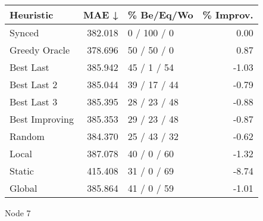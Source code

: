 \begin{tabular}{lrlr}
\toprule
\textbf{Heuristic} & \textbf{MAE ↓} & \textbf{\% Be/Eq/Wo} & \textbf{\% Improv.} \\
\midrule
            Synced &        382.018 &          0 / 100 / 0 &                0.00 \\
     Greedy Oracle &        378.696 &          50 / 50 / 0 &                0.87 \\
         Best Last &        385.942 &          45 / 1 / 54 &               -1.03 \\
       Best Last 2 &        385.044 &         39 / 17 / 44 &               -0.79 \\
       Best Last 3 &        385.395 &         28 / 23 / 48 &               -0.88 \\
    Best Improving &        385.353 &         29 / 23 / 48 &               -0.87 \\
            Random &        384.370 &         25 / 43 / 32 &               -0.62 \\
             Local &        387.078 &          40 / 0 / 60 &               -1.32 \\
            Static &        415.408 &          31 / 0 / 69 &               -8.74 \\
            Global &        385.864 &          41 / 0 / 59 &               -1.01 \\
\bottomrule
\end{tabular}
\caption{Node 7}
\label{tab:iid_lr05_le2_bs4_7}

